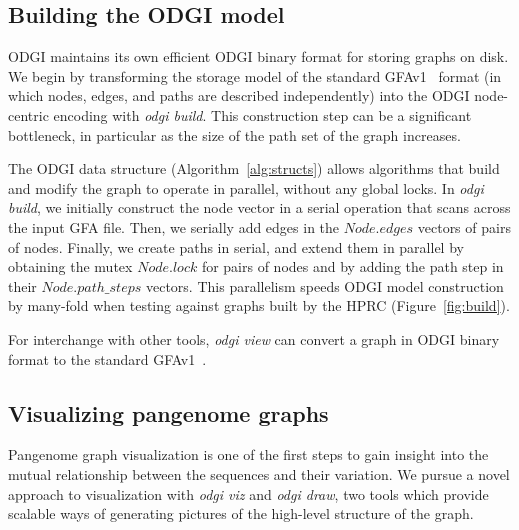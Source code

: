 \documentclass{bioinfo}
\begin{document}



\subsection{Building the \textsc{ODGI} model}
\label{sec:build}
ODGI maintains its own efficient ODGI binary format for storing graphs on disk.
We begin by transforming the storage model of the standard GFAv1~\citep{GFA} format (in which nodes, edges, and paths are described independently) into the ODGI node-centric encoding with \textit{odgi build}.
This construction step can be a significant bottleneck, in particular as the size of the path set of the graph increases.

The ODGI data structure (Algorithm~\ref{alg:structs}) allows algorithms that build and modify the graph to operate in parallel, without any global locks.
In \textit{odgi build}, we initially construct the node vector in a serial operation that scans across the input GFA file.
Then, we serially add edges in the $Node.edges$ vectors of pairs of nodes.
Finally, we create paths in serial, and extend them in parallel by obtaining the mutex $Node.lock$ for pairs of nodes and by adding the path step in their $Node.path\_steps$ vectors.
This parallelism speeds ODGI model construction by many-fold when testing against graphs built by the HPRC (Figure~\ref{fig:build}).

For interchange with other tools, \textit{odgi view} can convert a graph in ODGI binary format to the standard GFAv1~\citep{GFA}.


\subsection{Visualizing pangenome graphs}
\label{sec:viz}


Pangenome graph visualization is one of the first steps to gain insight into the mutual relationship between the sequences and their variation.
We pursue a novel approach to visualization with \textit{odgi viz} and \textit{odgi draw}, two tools which provide scalable ways of generating pictures of the high-level structure of the graph.
\end{document}
